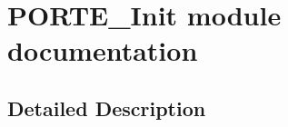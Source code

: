 \hypertarget{group___p_o_r_t_e___init__module}{}\section{P\+O\+R\+T\+E\+\_\+\+Init module documentation}
\label{group___p_o_r_t_e___init__module}


\subsection{Detailed Description}

